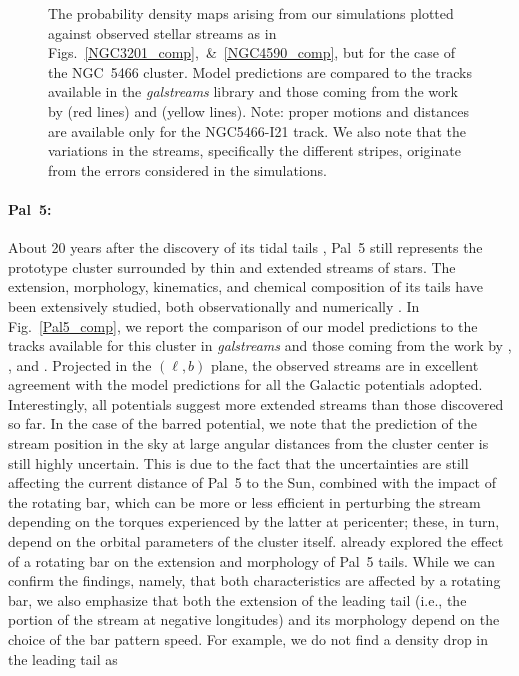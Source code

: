 \begin{figure}
                \caption{The probability density maps arising from our simulations plotted against observed stellar streams as in Figs.~\ref{NGC3201_comp},~\&~\ref{NGC4590_comp}, but for the case of the NGC~5466 cluster. Model predictions are compared to the tracks available in the \textit{galstreams} library and those coming from the work by  \citet{2006ApJ...639L..17G} (red lines) and \citet{2021ApJ...914..123I} (yellow lines). Note: proper motions and distances are available only for the NGC5466-I21 track. We also note that the variations in the streams, specifically the different stripes, originate from the errors considered in the simulations.\label{NGC5466_comp}}
            \end{figure}  
            \onecolumn          
            
            \paragraph{Pal~5: } About 20 years after the discovery of its tidal tails \citep{2001ApJ...548L.165O, 2003AJ....126.2385O}, Pal~5 still represents the prototype cluster surrounded by thin and extended streams of stars. The extension, morphology, kinematics, and chemical composition of its tails have been extensively studied, both observationally and numerically \citep{2003AJ....126.2385O, 2002AJ....124..349R, 2004AJ....127.2753D, koch04, 2006ApJ...641L..37G, 2009AJ....137.3378O, 2012A&A...546L...7M, 2015ApJ...803...80K, 2015MNRAS.446.3297K, fritz15, 2016ApJ...819....1I, ishigaki16, 2016MNRAS.460.2711T, koch17, 2017ApJ...842..120I, 2017NatAs...1..633P, 2019AJ....158..223P, 2020MNRAS.493.4978S, 2020ApJ...889...70B, 2021ApJ...914..123I,  philips22, kuzma22}. In Fig.~\ref{Pal5_comp}, we report the comparison of our model predictions to the tracks available for this cluster in \textit{galstreams} and  those coming from the work by \citet{2019AJ....158..223P}, \citet{2020MNRAS.493.4978S}, and \citet{2021ApJ...914..123I}. Projected in the $(\ell, b)$ plane, the observed streams are in excellent agreement with the model predictions for all the Galactic potentials adopted. Interestingly, all potentials suggest more extended streams than those discovered so far. In the case of the barred potential, we note that the prediction of the stream position in the sky at large angular distances from the cluster center is still highly uncertain. This is due to the fact that the uncertainties are still affecting the current distance of Pal~5 to the Sun, combined with the impact of the rotating bar, which can be more or less efficient in perturbing the stream depending on the torques experienced by the latter at pericenter; these, in turn, depend on the orbital parameters of the cluster itself. \citet{2017NatAs...1..633P} already explored the effect of a rotating bar on the extension and morphology of Pal~5 tails. While we can confirm the \citet{2017NatAs...1..633P} findings, namely, that both characteristics are affected by a rotating bar, we also emphasize that both the extension of the leading tail (i.e., the portion of the stream at negative longitudes) and its morphology depend on the choice of the bar pattern speed. For example, we do not find a density drop in the leading tail as 